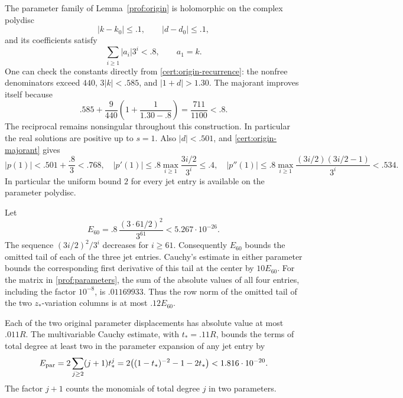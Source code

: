 The parameter family of Lemma~\ref{prof:origin} is holomorphic on the
complex polydisc
\[
 |k-k_0|\le .1,\qquad |d-d_0|\le .1,
\]
and its coefficients satisfy
\begin{equation}\label{cert:origin-majorant}
 \sum_{i\ge1}|a_i|3^i<.8,\qquad a_1=k.
\end{equation}
One can check the constants directly from
\eqref{cert:origin-recurrence}: the nonfree denominators exceed \(440\),
\(3|k|<.585\), and \(|1+d|>1.30\).  The majorant improves itself because
\[
 .585+\frac9{440}\left(1+\frac1{1.30-.8}\right)
 =\frac{711}{1100}<.8.
\]
The reciprocal remains nonsingular throughout this construction.
In particular the real solutions are positive up to \(s=1\).
Also \(|d|<.501\), and \eqref{cert:origin-majorant} gives
\[
 |p(1)|<.501+\frac{.8}3<.768,\quad
 |p'(1)|\le .8\max_{i\ge1}\frac{3i/2}{3^i}\le .4,\quad
 |p''(1)|\le .8\max_{i\ge1}
       \frac{(3i/2)(3i/2-1)}{3^i}<.534.
\]
In particular the uniform bound \(2\) for every jet entry is available on
the parameter polydisc.

Let
\begin{equation}\label{cert:origin-tail}
 E_{60}=.8\,\frac{(3\cdot61/2)^2}{3^{61}}
       <5.267\cdot10^{-26}.
\end{equation}
The sequence \((3i/2)^2/3^i\) decreases for \(i\ge61\).
Consequently \(E_{60}\) bounds the omitted tail of each of the three jet
entries.  Cauchy's estimate in either parameter bounds the corresponding
first derivative of this tail at the center by \(10E_{60}\).
For the matrix in \eqref{prof:parameters}, the sum of the absolute values
of all four entries, including the factor \(10^{-8}\), is
\(.01169933\).  Thus the row norm of the omitted tail of the two
\(z_*\)-variation columns is at most \(.12E_{60}\).

Each of the two original parameter displacements has absolute value at most
\(.011R\).  The multivariable Cauchy estimate, with
\(t_*=.11R\), bounds the terms of total degree at least two in the parameter
expansion of any jet entry by
\begin{equation}\label{cert:parameter-tail}
 E_{\rm par}
 =2\sum_{j\ge2}(j+1)t_*^j
 =2\bigl((1-t_*)^{-2}-1-2t_*\bigr)
 <1.816\cdot10^{-20}.
\end{equation}
The factor \(j+1\) counts the monomials of total degree \(j\) in two
parameters.


